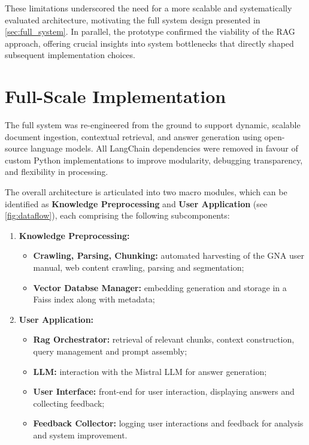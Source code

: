 \begin{spacing}{1.5}
These limitations underscored the need for a more scalable and systematically evaluated architecture, motivating the full system design presented in \autoref{sec:full_system}. In parallel, the prototype confirmed the viability of the RAG approach, offering crucial insights into system bottlenecks that directly shaped subsequent implementation choices.


\section{Full-Scale Implementation}\label{sec:full_system}
The full system was re-engineered from the ground to support dynamic, scalable document ingestion, contextual retrieval, and answer generation using open-source language models. All LangChain dependencies were removed in favour of custom Python implementations to improve modularity, debugging transparency, and flexibility in processing. 

The overall architecture is articulated into two macro modules, which can be identified as \textbf{Knowledge Preprocessing} and \textbf{User Application} (see \autoref{fig:dataflow}), each comprising the following subcomponents:
\begin{enumerate}
      \item \textbf{Knowledge Preprocessing:}
      \begin{itemize}
        \item \textbf{Crawling, Parsing, Chunking:} automated harvesting of the GNA user manual, web content crawling, parsing and segmentation;
        \item \textbf{Vector Databse Manager:} embedding generation and storage in a Faiss index along with metadata;
      \end{itemize}
      \item \textbf{User Application:}
      \begin{itemize}
        \item \textbf{Rag Orchestrator:} retrieval of relevant chunks, context construction, query management and prompt assembly;
        \item \textbf{LLM:} interaction with the Mistral LLM for answer generation;
        \item \textbf{User Interface:} front-end for user interaction, displaying answers and collecting feedback;
        \item \textbf{Feedback Collector:} logging user interactions and feedback for analysis and system improvement.
      \end{itemize}
\end{enumerate}


\end{spacing}
